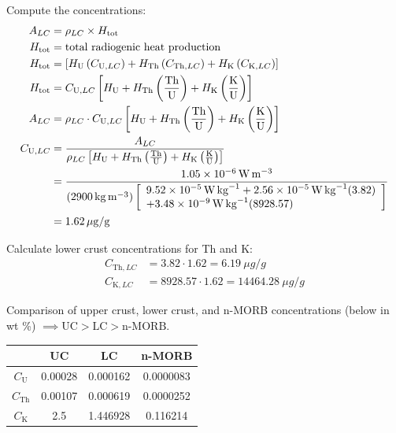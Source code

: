 \documentclass{template}
\begin{document}
\begin{enumerate}[label=\textbf{\arabic*.}]
\begin{enumerate}[label=\alph*)]
{    Compute the concentrations:
    \begin{align*}
        A_{LC} &= \rho_{LC} \times H_{\text{tot}} \\
        H_{\text{tot}} &= \text{total radiogenic heat production} \\
        H_{\text{tot}} &= \left[ H_{\text{U}} \left(C_{\text{U}, LC}\right) + H_{\text{Th}} \left(C_{\text{Th}, LC}\right) + H_{\text{K}} \left(C_{\text{K}, LC}\right) \right] \\
        H_{\text{tot}} &= C_{\text{U}, LC} \left[ H_{\text{U}} + H_{\text{Th}} \left(\frac{\text{Th}}{\text{U}}\right) + H_{\text{K}} \left(\frac{\text{K}}{\text{U}}\right) \right] \\
        A_{LC} &= \rho_{LC} \cdot C_{\text{U}, LC} \left[ H_{\text{U}} + H_{\text{Th}} \left(\frac{\text{Th}}{\text{U}}\right) + H_{\text{K}} \left(\frac{\text{K}}{\text{U}}\right) \right] \\
        C_{\text{U}, LC} &= \frac{A_{LC}}{\rho_{LC} \left[ H_{\text{U}} + H_{\text{Th}} \left(\frac{\text{Th}}{\text{U}}\right) + H_{\text{K}} \left(\frac{\text{K}}{\text{U}}\right) \right]} \\
        &= \frac{\qty{1.05E-6}{\watt\per\meter\cubed}}{
            \left(\qty{2900}{\kg\per\meter\cubed}\right)
            \left[ \begin{array}{l}
            \qty{9.52E-5}{\watt\per\kg} + \qty{2.56E-5}{\watt\per\kg}(3.82) \\
            + \qty{3.48E-9}{\watt\per\kg}(8928.57)
            \end{array} \right]
        }\\
        &= \qty{1.62}{\mu g/g}
    \end{align*}

    Calculate lower crust concentrations for Th and K:
    \begin{align*}
        C_{\text{Th}, LC} &= 3.82 \cdot \num{1.62} = \qty{6.19}{\mu g/g}\\
        C_{\text{K}, LC} &= 8928.57 \cdot \num{1.62} = \qty{14464.28}{\mu g/g}
    \end{align*}

    Comparison of upper crust, lower crust, and n-MORB concentrations (below in wt \%) $\implies \text{UC} > \text{LC} > \text{n-MORB}$.
    \begin{table}[H]
        \begin{tabular}{c | c c c}
            & UC & LC & n-MORB \parencite{galeMeanCompositionOcean2013} \\
            \hline
            $C_{\text{U}}$ & 0.00028 & 0.000162 & 0.0000083 \\
            $C_{\text{Th}}$ & 0.00107 & 0.000619 & 0.0000252 \\
            $C_{\text{K}}$ & 2.5 & 1.446928 & 0.116214
        \end{tabular}
    \end{table}
}


\end{enumerate}
\end{enumerate}
\end{document}
